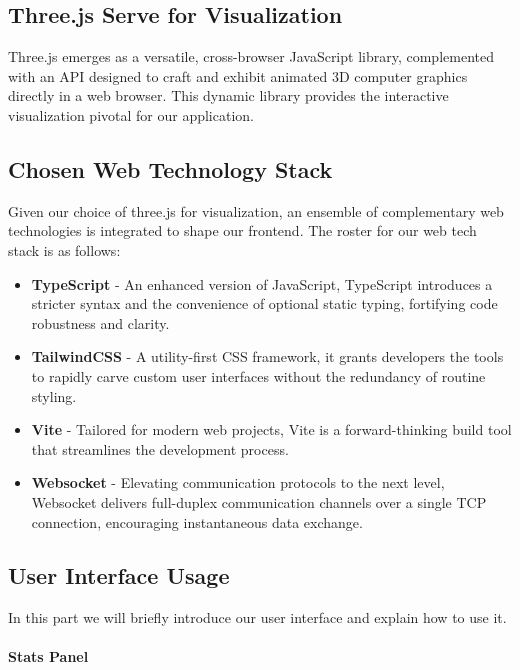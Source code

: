 \documentclass[11pt, a4paper,oneside,chapterprefix=false]{scrbook}
\begin{document}
\subsection{Three.js Serve for Visualization}

Three.js emerges as a versatile, cross-browser JavaScript library, complemented with an API designed to craft and exhibit animated 3D computer graphics directly in a web browser. This dynamic library provides the interactive visualization pivotal for our application.

\subsection{Chosen Web Technology Stack}

Given our choice of three.js for visualization, an ensemble of complementary web technologies is integrated to shape our frontend. The roster for our web tech stack is as follows:

\begin{itemize}
	\item \textbf{TypeScript} - An enhanced version of JavaScript, TypeScript introduces a stricter syntax and the convenience of optional static typing, fortifying code robustness and clarity.
	
	\item \textbf{TailwindCSS} - A utility-first CSS framework, it grants developers the tools to rapidly carve custom user interfaces without the redundancy of routine styling.
	
	\item \textbf{Vite} - Tailored for modern web projects, Vite is a forward-thinking build tool that streamlines the development process.
	
	\item \textbf{Websocket} - Elevating communication protocols to the next level, Websocket delivers full-duplex communication channels over a single TCP connection, encouraging instantaneous data exchange.
\end{itemize}

\subsection{User Interface Usage}

In this part we will briefly introduce our user interface and explain how to use it.

\paragraph{Stats Panel}
\end{document}
